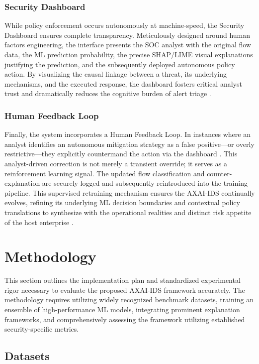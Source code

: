 \documentclass[conference]{IEEEtran}
\begin{document}
\subsubsection{Security Dashboard}
While policy enforcement occurs autonomously at machine-speed, the Security Dashboard ensures complete transparency. Meticulously designed around human factors engineering, the interface presents the SOC analyst with the original flow data, the ML prediction probability, the precise SHAP/LIME visual explanations justifying the prediction, and the subsequently deployed autonomous policy action. By visualizing the causal linkage between a threat, its underlying mechanisms, and the executed response, the dashboard fosters critical analyst trust and dramatically reduces the cognitive burden of alert triage \cite{wang2021explainable}.

\subsubsection{Human Feedback Loop}
Finally, the system incorporates a Human Feedback Loop. In instances where an analyst identifies an autonomous mitigation strategy as a false positive—or overly restrictive—they explicitly countermand the action via the dashboard \cite{lundberg2017unified}. This analyst-driven correction is not merely a transient override; it serves as a reinforcement learning signal. The updated flow classification and counter-explanation are securely logged and subsequently reintroduced into the training pipeline. This supervised retraining mechanism ensures the AXAI-IDS continually evolves, refining its underlying ML decision boundaries and contextual policy translations to synthesize with the operational realities and distinct risk appetite of the host enterprise \cite{ribeiro2016should, sharafaldin2018toward}. 


\section{Methodology}

This section outlines the implementation plan and standardized experimental rigor necessary to evaluate the proposed AXAI-IDS framework accurately. The methodology requires utilizing widely recognized benchmark datasets, training an ensemble of high-performance ML models, integrating prominent explanation frameworks, and comprehensively assessing the framework utilizing established security-specific metrics.

\subsection{Datasets}
\end{document}
